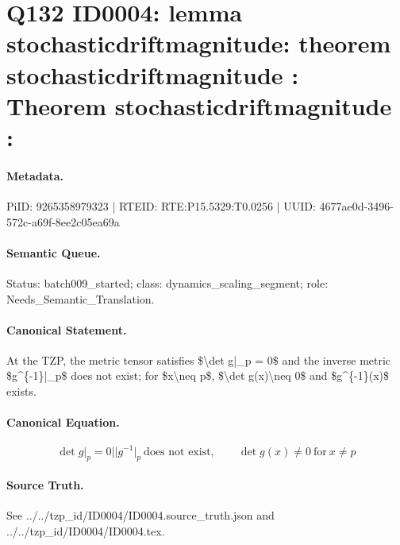 \section*{Q132 ID0004: lemma stochasticdriftmagnitude: theorem stochasticdriftmagnitude : Theorem stochasticdriftmagnitude :}
\paragraph{Metadata.}
PiID: 9265358979323 | RTEID: RTE:P15.5329:T0.0256 | UUID: 4677ae0d-3496-572c-a69f-8ee2c05ea69a

\paragraph{Semantic Queue.}
Status: batch009\_started; class: dynamics\_scaling\_segment; role: Needs\_Semantic\_Translation.

\paragraph{Canonical Statement.}
At the TZP, the metric tensor satisfies \$\textbackslash{}det g|\_p = 0\$ and the inverse metric \$g\textasciicircum{}\{-1\}|\_p\$ does not exist; for \$x\textbackslash{}neq p\$, \$\textbackslash{}det g(x)\textbackslash{}neq 0\$ and \$g\textasciicircum{}\{-1\}(x)\$ exists.

\paragraph{Canonical Equation.}
\[
\det g\vert_{p}=0 || g^{-1}\vert_{p}\ \text{does not exist}, \qquad \det g(x)\neq 0 \ \text{for}\ x\neq p
\]

\paragraph{Source Truth.}
See ../../tzp\_id/ID0004/ID0004.source\_truth.json and ../../tzp\_id/ID0004/ID0004.tex.
